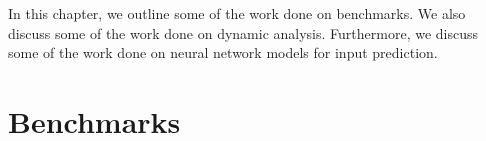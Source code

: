 In this chapter, we outline some of the work done on benchmarks.
We also discuss some of the work done on dynamic analysis.
Furthermore, we discuss some of the work done on neural network models for input prediction.

\section{Benchmarks}

